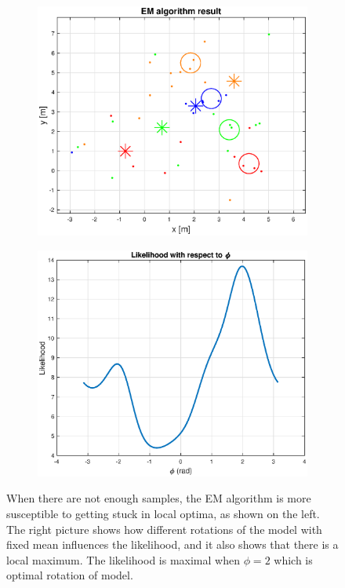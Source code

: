 \begin{figure}[H]
	\centering
	\begin{subfigure}{0.49\textwidth}
		\centering
		\includegraphics[scale=0.43]{fig/em_local.eps}
	\end{subfigure}
	\begin{subfigure}{.49\textwidth}
		\centering
		\includegraphics[scale=0.43]{fig/em_local_chart.eps}
		
	\end{subfigure}
	
	\caption[EM local optima]{When there are not enough samples, the EM algorithm is more susceptible to getting stuck in local optima, as shown on the left. The right picture shows how different rotations of the model with fixed mean influences the likelihood, and it also shows that there is a local maximum.  The likelihood is maximal when $\phi = 2$ which is optimal rotation of model.}
	\label{fig:em_local}
\end{figure}

